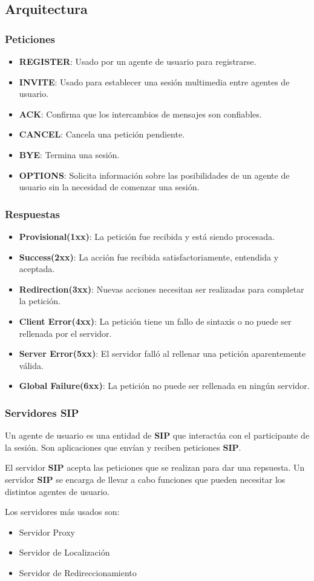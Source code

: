 \documentclass{beamer}
\begin{document}
\subsection{Arquitectura}
\begin{frame}
\frametitle{Peticiones}
		\begin{itemize}
			\item \textbf{REGISTER}: Usado por un agente de usuario para registrarse.
			\item \textbf{INVITE}: Usado para establecer una sesión multimedia entre agentes de usuario.
			\item \textbf{ACK}: Confirma que los intercambios de mensajes son confiables.
			\item \textbf{CANCEL}: Cancela una petición pendiente.
			\item \textbf{BYE}: Termina una sesión.
			\item \textbf{OPTIONS}: Solicita información sobre las posibilidades de un agente de usuario sin la necesidad de comenzar una sesión.
		\end{itemize}
\end{frame}
\begin{frame}
\frametitle{Respuestas}
\begin{itemize}
			\item \textbf{Provisional(1xx)}: La petición fue recibida y está siendo  procesada.
			\item \textbf{Success(2xx)}: La acción fue recibida satisfactoriamente, entendida y aceptada.
			\item \textbf{Redirection(3xx)}: Nuevas acciones necesitan ser realizadas para completar la petición.
			\item \textbf{Client Error(4xx)}: La petición tiene un fallo de sintaxis o no puede ser rellenada por el servidor.
			\item \textbf{Server Error(5xx)}: El servidor falló al rellenar una petición aparentemente válida.
			\item \textbf{Global Failure(6xx)}: La petición no puede ser rellenada en ningún servidor.
		\end{itemize}
\end{frame}

\begin{frame}
	\frametitle{Servidores SIP}
	Un agente de usuario es una entidad de \textbf{SIP} que interactúa con el participante de la sesión. Son aplicaciones que envían y reciben peticiones \textbf{SIP}.
	
	El servidor \textbf{SIP} acepta las peticiones que se realizan para dar una repsuesta. Un servidor \textbf{SIP} se encarga de llevar a cabo funciones que pueden necesitar los distintos agentes de usuario.
	
	Los servidores más usados son:
	\begin{itemize}
		\item Servidor Proxy
		\item Servidor de Localización
		\item Servidor de Redireccionamiento
	\end{itemize}
\end{frame}
\end{document}
